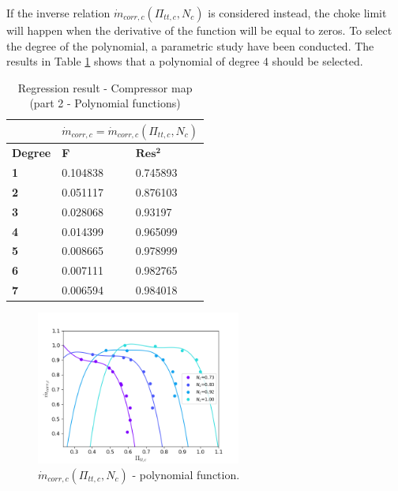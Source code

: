 If the inverse relation $\dot{m}_{corr,c}(\Pi_{tt,c},N_c)$ is considered instead, the choke limit will happen when the derivative of the function will be equal to zeros. To select the degree of the polynomial, a parametric study have been conducted. The results in Table \ref{tab:C7_regcomp2} shows that a polynomial of degree 4 should be selected.

\begin{longtable}[c]{@{}lll@{}}
\caption{Regression result - Compressor map (part 2 - Polynomial functions)}
\label{tab:C7_regcomp2}\\
\toprule
                & \multicolumn{2}{l}{$\dot{m}_{corr,c} = \dot{m}_{corr,c}(\Pi_{tt,c},N_c)$} \\* \midrule
\endfirsthead
%
\endhead
%
\bottomrule
\endfoot
%
\endlastfoot
%
\textbf{Degree} & \textbf{F}                       & $\mathbf{Res^2}$                       \\
\textbf{1}      & 0.104838                         & 0.745893                               \\
\textbf{2}      & 0.051117                         & 0.876103                               \\
\textbf{3}      & 0.028068                         & 0.93197                                \\
\textbf{4}      & 0.014399                         & 0.965099                               \\
\textbf{5}      & 0.008665                         & 0.978999                               \\
\textbf{6}      & 0.007111                         & 0.982765                               \\
\textbf{7}      & 0.006594                         & 0.984018                               \\* \bottomrule
\end{longtable}

\begin{figure}[h]
    \centering
    \includegraphics[width=0.6\textwidth]{Comp_map/calc_231_map.png}
    \caption{$\dot{m}_{corr,c}(\Pi_{tt,c},N_c)$ - polynomial function.}
    \label{fig:C7_polycomp3}
\end{figure}

